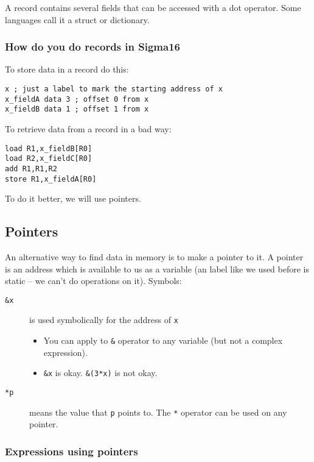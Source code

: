 A record contains several fields that can be accessed with a dot operator.
Some languages call it a struct or dictionary.

\subsubsection{How do you do records in Sigma16}\label{ssub:how_do_you_do_records_in_sigma16}

To store data in a record do this:
\begin{verbatim}
x ; just a label to mark the starting address of x
x_fieldA data 3 ; offset 0 from x
x_fieldB data 1 ; offset 1 from x
\end{verbatim}
To retrieve data from a record in a bad way:
\begin{verbatim}
load R1,x_fieldB[R0]
load R2,x_fieldC[R0]
add R1,R1,R2
store R1,x_fieldA[R0]
\end{verbatim}
To do it better, we will use pointers.

\subsection{Pointers}\label{sub:pointers}

An alternative way to find data in memory is to make a pointer to it.
A pointer is an address which is available to us as a variable (an label like we used before is static -- we can't do operations on it).
Symbols:
\begin{description}
	\item[\texttt{&x}] is used symbolically for the address of \texttt{x}
	      \begin{itemize}
		      \item You can apply to \texttt{&} operator to any variable (but not a complex expression).
		      \item \texttt{&x} is okay.
		            \texttt{&(3*x)} is not okay.
	      \end{itemize}
	\item[\texttt{*p}] means the value that \texttt{p} points to.
	      The \texttt{*} operator can be used on any pointer.
\end{description}

\subsubsection{Expressions using pointers}\label{ssub:expressions_using_pointers}

